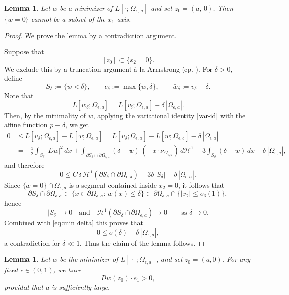 \documentclass[reqno,11pt]{amsart}
\makeatletter
\def\ez{\epsilon}
\newtheorem{lem}[thm]{Lemma}%
\numberwithin{equation}{section}
\theoremstyle{remark}
\makeatother
\begin{document}
\begin{lem}\label{no 1d zero}
Let $w$ be a minimizer of $L[\cdot;\,\Omega_{\ez,\,a}]$ and set $z_0=(a,\,0)$. Then  $\{w=0\}$ cannot be a subset of the $x_1$-axis. 
\end{lem}
\begin{proof}
We prove the lemma by a contradiction argument. 

Suppose that
$$[z_0]\subset\{x_2=0\}.$$
We exclude this by a truncation argument \`a la Armstrong (cp. \cite{A1996}). For \(\delta>0\), define
\[
S_\delta:=\{ w<\delta\},
\qquad
v_\delta:=\max\{w,\delta\},
\qquad
\bar w_\delta:=v_\delta-\delta.
\]
Note that
$$
L[\bar w_\delta;\Omega_{\epsilon,a}]
=
L[v_\delta;\Omega_{\epsilon,a}]
-\delta\,|\Omega_{\epsilon,a}|.
$$
Then, 
by the minimality of \(w\),
applying the variational identity \eqref{var-id} with the affine function \(p\equiv\delta\), we get
\begin{align*}
0&\leq L[v_\delta;\Omega_{\epsilon,a}]-L[w;\Omega_{\epsilon,a}]=L[v_\delta;\Omega_{\epsilon,a}]-L[w;\Omega_{\epsilon,a}]-\delta\,|\Omega_{\epsilon,a}|\\
&=
-\frac12\int_{S_\delta}|Dw|^2\,dx
+\int_{\partial S_\delta\cap\partial\Omega_{\epsilon,a}}
(\delta-w)\,(-x\cdot\nu_{\Omega_{\epsilon,a}})\,d\mathscr H^1 
+3\int_{S_\delta}(\delta-w)\,dx-\delta\,|\Omega_{\epsilon,a}|,
\end{align*}
and therefore
\begin{equation}\label{eq:min delta}
    0\le
C\,\delta\,
\mathscr H^1(\partial S_\delta\cap\partial\Omega_{\epsilon,a})+3\delta\,|S_\delta|
-\delta\,|\Omega_{\epsilon,a}|.
\end{equation}
Since \(\{w=0\}\cap\Omega_{\epsilon,a}\) is a segment contained inside ${x_2=0}$,
it follows that
$$\partial S_\delta\cap\partial\Omega_{\epsilon,a}
\subset
\{x\in\partial\Omega_{\epsilon,a}:\ w(x)\le\delta\}\subset \partial\Omega_{\epsilon,a}\cap \{ |x_2|\leq o_\delta(1)\},
$$
hence
\[
|S_\delta|\to0\quad \text{and}\quad \mathscr H^1(\partial S_\delta\cap\partial\Omega_{\epsilon,a})\to0
\qquad\text{as }\delta\to 0.
\]
Combined with  \eqref{eq:min delta} this proves that
$$
0\le
o(\delta)-\delta\,|\Omega_{\epsilon,a}|,
$$
a contradiction for $\delta \ll 1$.
Thus the claim of the lemma follows. 
\end{proof}

\begin{lem}\label{pslope}
Let $w$ be the minimizer of $L[\,\cdot\,;\Omega_{\epsilon,a}]$, and set $z_0=(a,0)$.
For any fixed $\epsilon\in(0,1)$, we have
\[
Dw(z_0)\cdot e_1>0,
\]
provided that $a$ is sufficiently large.
\end{lem}
\end{document}
